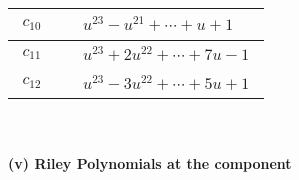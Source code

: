 \documentclass[1p]{elsarticle_modified}
\theoremstyle{definition}
\begin{document}
\begin{tabular}{m{50pt}|m{274pt}}
\hline $$\begin{aligned}c_{10}\end{aligned}$$&$\begin{aligned}
&u^{23}- u^{21}+\cdots+u+1
\end{aligned}$\\
\hline $$\begin{aligned}c_{11}\end{aligned}$$&$\begin{aligned}
&u^{23}+2 u^{22}+\cdots+7 u-1
\end{aligned}$\\
\hline $$\begin{aligned}c_{12}\end{aligned}$$&$\begin{aligned}
&u^{23}-3 u^{22}+\cdots+5 u+1
\end{aligned}$\\
\hline
\end{tabular}\\~\\
\newpage\renewcommand{\arraystretch}{1}
\flushleft \textbf{(v) Riley Polynomials at the component}\newline \\
\end{document}
